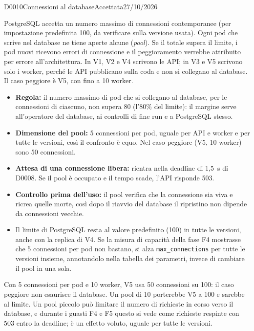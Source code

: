 \begin{decisione}{D0010}{Connessioni al database}{Accettata}{27/10/2026}

\contesto
PostgreSQL accetta un numero massimo di connessioni contemporanee (per impostazione predefinita 100, da verificare sulla versione usata). Ogni pod che scrive nel database ne tiene aperte alcune (\emph{pool}). Se il totale supera il limite, i pod nuovi ricevono errori di connessione e il peggioramento verrebbe attribuito per errore all'architettura. In V1, V2 e V4 scrivono le API; in V3 e V5 scrivono solo i worker, perché le API pubblicano sulla coda e non si collegano al database. Il caso peggiore è V5, con fino a 10 worker.

\scelta
\begin{itemize}
  \item \textbf{Regola:} il numero massimo di pod che si collegano al database, per le connessioni di ciascuno, non supera 80 (l'80\% del limite): il margine serve all'operatore del database, ai controlli di fine run e a PostgreSQL stesso.
  \item \textbf{Dimensione del pool:} 5 connessioni per pod, uguale per API e worker e per tutte le versioni, così il confronto è equo. Nel caso peggiore (V5, 10 worker) sono 50 connessioni.
  \item \textbf{Attesa di una connessione libera:} rientra nella deadline di 1,5~s di D0008. Se il pool è occupato e il tempo scade, l'API risponde 503.
  \item \textbf{Controllo prima dell'uso:} il pool verifica che la connessione sia viva e ricrea quelle morte, così dopo il riavvio del database il ripristino non dipende da connessioni vecchie.
  \item Il limite di PostgreSQL resta al valore predefinito (100) in tutte le versioni, anche con la replica di V4. Se la misura di capacità della fase F4 mostrasse che 5 connessioni per pod non bastano, si alza \texttt{max\_connections} per tutte le versioni insieme, annotandolo nella tabella dei parametri, invece di cambiare il pool in una sola.
\end{itemize}

\conseguenze
Con 5 connessioni per pod e 10 worker, V5 usa 50 connessioni su 100: il caso peggiore non esaurisce il database. Un pool di 10 porterebbe V5 a 100 e sarebbe al limite. Un pool piccolo può limitare il numero di richieste in corso verso il database, e durante i guasti F4 e F5 questo si vede come richieste respinte con 503 entro la deadline; è un effetto voluto, uguale per tutte le versioni.

\end{decisione}
